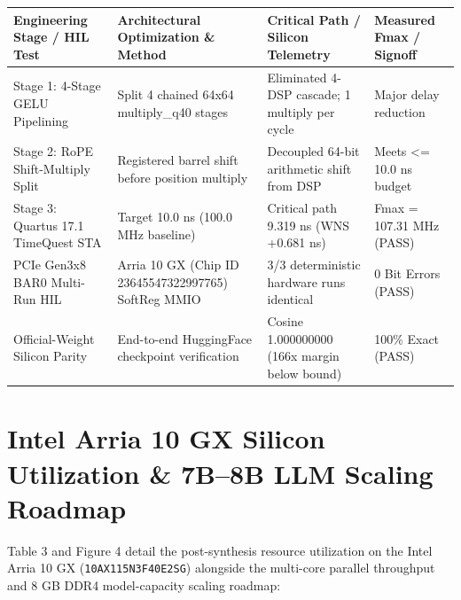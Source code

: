 \documentclass[11pt,a4paper]{article}
\begin{document}
{\footnotesize\renewcommand{\arraystretch}{1.14}\begin{longtable}{@{}L{0.23\textwidth}L{0.27\textwidth}L{0.24\textwidth}L{0.16\textwidth}@{}}\toprule

\textbf{Engineering Stage /\allowbreak{} HIL Test} & \textbf{Architectural Optimization \& Method} & \textbf{Critical Path /\allowbreak{} Silicon Telemetry} & \textbf{Measured Fmax /\allowbreak{} Signoff}\\\midrule\endhead

Stage 1: 4-Stage GELU Pipelining & Split 4 chained 64x64 multiply\_\allowbreak{}q40 stages & Eliminated 4-DSP cascade; 1 multiply per cycle & Major delay reduction\\[2pt]

Stage 2: RoPE Shift-Multiply Split & Registered barrel shift before position multiply & Decoupled 64-bit arithmetic shift from DSP & Meets <=\allowbreak{} 10.0 ns budget\\[2pt]

Stage 3: Quartus 17.1 TimeQuest STA & Target 10.0 ns (\allowbreak{}100.0 MHz baseline)\allowbreak{} & Critical path 9.319 ns (\allowbreak{}WNS +\allowbreak{}0.681 ns)\allowbreak{} & Fmax =\allowbreak{} 107.31 MHz (\allowbreak{}PASS)\allowbreak{}\\[2pt]

PCIe Gen3x8 BAR0 Multi-Run HIL & Arria 10 GX (\allowbreak{}Chip ID 23645547\allowbreak{}32299776\allowbreak{}5)\allowbreak{} SoftReg MMIO & 3/\allowbreak{}3 deterministic hardware runs identical & 0 Bit Errors (\allowbreak{}PASS)\allowbreak{}\\[2pt]

Official-Weight Silicon Parity & End-to-end HuggingFace checkpoint verification & Cosine 1.00000000\allowbreak{}0 (\allowbreak{}166x margin below bound)\allowbreak{} & 100\% Exact (\allowbreak{}PASS)\allowbreak{}\\[2pt]

\bottomrule\end{longtable}}

\section{Intel Arria 10 GX Silicon Utilization \& 7B--8B LLM Scaling Roadmap}

Table 3 and Figure 4 detail the post-synthesis resource utilization on the Intel Arria 10 GX (\texttt{10AX115N3F40E2SG}) alongside the multi-core parallel throughput and 8 GB DDR4 model-capacity scaling roadmap:
\end{document}
